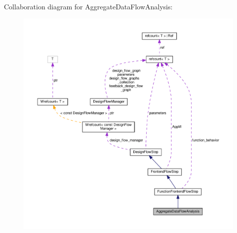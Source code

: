Collaboration diagram for Aggregate\+Data\+Flow\+Analysis\+:
\nopagebreak
\begin{figure}[H]
\begin{center}
\leavevmode
\includegraphics[width=350pt]{d5/dc9/classAggregateDataFlowAnalysis__coll__graph}
\end{center}
\end{figure}
